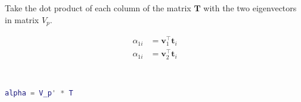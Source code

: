 Take the dot product of each column of the matrix $\boldsymbol{T}$ with the two eigenvectors in matrix $V_p$.

\begin{align*}
    \alpha_{1i} &= \boldsymbol{v}_1^\intercal\boldsymbol{t}_i \\
    \alpha_{1i} &= \boldsymbol{v}_2^\intercal\boldsymbol{t}_i
\end{align*}

\begin{solution} \
    \begin{lstlisting}[language=Matlab]
alpha = V_p' * T
    \end{lstlisting}
\end{solution}